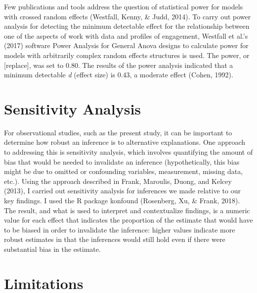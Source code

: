 \documentclass[]{msu-thesis}
\theoremstyle{definition}
\theoremstyle{definition}
\theoremstyle{definition}
\theoremstyle{remark}
\begin{document}
Few publications and tools address the question of statistical power for
models with crossed random effects (Westfall, Kenny, \& Judd, 2014). To
carry out power analysis for detecting the minimum detectable effect for
the relationship between one of the aspects of work with data and
profiles of engagement, Westfall et al.'s (2017) software Power Analysis
for General Anova designs to calculate power for models with arbitrarily
complex random effects structures is used. The power, or {[}replace{]},
was set to 0.80. The results of the power analysis indicated that a
minimum detectable \emph{d} (effect size) is 0.43, a moderate effect
(Cohen, 1992).

\section{Sensitivity Analysis}\label{sensitivity-analysis}

For observational studies, such as the present study, it can be
important to determine how robust an inference is to alternative
explanations. One approach to addressing this is sensitivity analysis,
which involves quantifying the amount of bias that would be needed to
invalidate an inference (hypothetically, this bias might be due to
omitted or confounding variables, measurement, missing data, etc.).
Using the approach described in Frank, Maroulis, Duong, and Kelcey
(2013), I carried out sensitivity analysis for inferences we made
relative to our key findings. I used the R package konfound (Rosenberg,
Xu, \& Frank, 2018). The result, and what is used to interpret and
contextualize findings, is a numeric value for each effect that
indicates the proportion of the estimate that would have to be biased in
order to invalidate the inference: higher values indicate more robust
estimates in that the inferences would still hold even if there were
substantial bias in the estimate.

\section{Limitations}\label{limitations}
\end{document}
